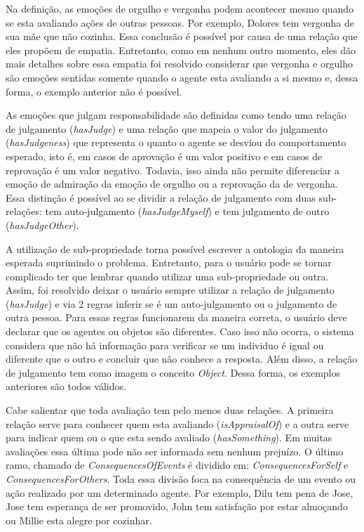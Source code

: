 Na definição, as emoções de orgulho e vergonha podem acontecer mesmo quando se
esta avaliando ações de outras pessoas. Por exemplo, Dolores tem vergonha de
sua mãe que não cozinha. Essa conclusão é possível por causa de uma relação
que eles propõem de empatia. Entretanto, como em nenhum outro momento, eles
dão mais detalhes sobre essa empatia foi resolvido considerar que vergonha e
orgulho são emoções sentidas somente quando o agente esta avaliando a si mesmo
e, dessa forma, o exemplo anterior não é possível. \dev{}

As emoções que julgam responsabilidade são definidas como tendo uma relação de
julgamento (\emph{hasJudge}) e uma relação que mapeia o valor do julgamento
(\emph{hasJudgeness}) que representa o quanto o agente se desviou do
comportamento esperado, isto é, em casos de aprovação é um valor positivo e em
casos de reprovação é um valor negativo. Todavia, isso ainda não permite
diferenciar a emoção de admiração da emoção de orgulho ou a reprovação da de
vergonha. Essa distinção é possível ao se dividir a relação de julgamento com
duas sub-relações: tem auto-julgamento (\emph{hasJudgeMyself}) e tem
julgamento de outro (\emph{hasJudgeOther}).

A utilização de sub-propriedade torna possível escrever a ontologia da maneira
esperada suprimindo o problema. Entretanto, para o usuário pode se tornar
complicado ter que lembrar quando utilizar uma sub-propriedade ou outra.
Assim, foi resolvido deixar o usuário sempre utilizar a relação de julgamento
(\emph{hasJudge}) e via 2 regras inferir se é um auto-julgamento ou o
julgamento de outra pessoa. Para essas regras funcionarem da maneira correta,
o usuário deve declarar que os agentes ou objetos são diferentes. Caso isso
não ocorra, o sistema considera que não há informação para verificar se um
individuo é igual ou diferente que o outro e concluir que não conhece a
resposta. Além disso, a relação de julgamento tem como imagem o conceito
\emph{Object}. Dessa forma, os exemplos anteriores são todos válidos.

Cabe salientar que toda avaliação tem pelo menos duas relações. A primeira
relação serve para conhecer quem esta avaliando (\emph{isAppraisalOf}) e a
outra serve para indicar quem ou o que esta sendo avaliado
(\emph{hasSomething}). Em muitas avaliações essa última pode não ser
informada sem nenhum prejuízo. O último ramo, chamado de
\emph{ConsequencesOfEvents} é dividido em: \emph{ConsequencesForSelf} e
\emph{ConsequencesForOthers}. Toda essa divisão foca na consequência de um
evento ou ação realizado por um determinado agente. Por exemplo, Dilu tem pena
de Jose, Jose tem esperança de ser promovido, John tem satisfação por
estar almoçando ou Millie esta alegre por cozinhar.

